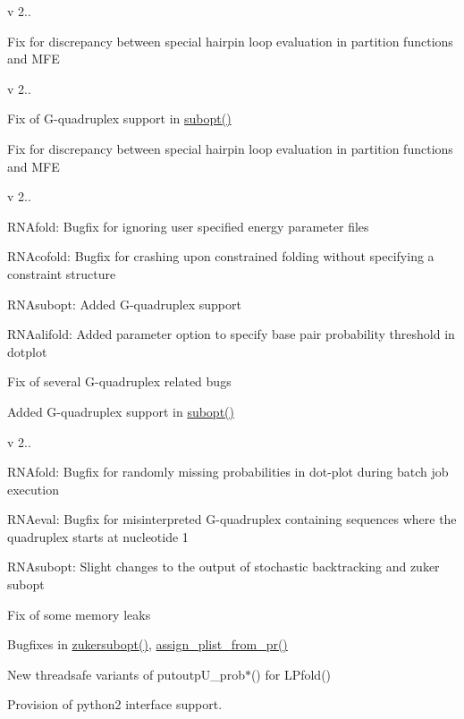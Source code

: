 v 2..
\begin{DoxyItemize}
\item Fix for discrepancy between special hairpin loop evaluation in partition functions and M\+FE
\end{DoxyItemize}

v 2..
\begin{DoxyItemize}
\item Fix of G-\/quadruplex support in \hyperlink{group__subopt__wuchty_ga700f662506a233e42dd7fda74fafd40e}{subopt()}
\item Fix for discrepancy between special hairpin loop evaluation in partition functions and M\+FE
\end{DoxyItemize}

v 2..
\begin{DoxyItemize}
\item R\+N\+Afold\+: Bugfix for ignoring user specified energy parameter files
\item R\+N\+Acofold\+: Bugfix for crashing upon constrained folding without specifying a constraint structure
\item R\+N\+Asubopt\+: Added G-\/quadruplex support
\item R\+N\+Aalifold\+: Added parameter option to specify base pair probability threshold in dotplot
\item Fix of several G-\/quadruplex related bugs
\item Added G-\/quadruplex support in \hyperlink{group__subopt__wuchty_ga700f662506a233e42dd7fda74fafd40e}{subopt()}
\end{DoxyItemize}

v 2..
\begin{DoxyItemize}
\item R\+N\+Afold\+: Bugfix for randomly missing probabilities in dot-\/plot during batch job execution
\item R\+N\+Aeval\+: Bugfix for misinterpreted G-\/quadruplex containing sequences where the quadruplex starts at nucleotide 1
\item R\+N\+Asubopt\+: Slight changes to the output of stochastic backtracking and zuker subopt
\item Fix of some memory leaks
\item Bugfixes in \hyperlink{group__subopt__zuker_ga0d5104e3ecf119d8eabd40aa5fe47f90}{zukersubopt()}, \hyperlink{group__pf__fold_ga1cc05aaa9b0e7df2d3887e98321c2030}{assign\+\_\+plist\+\_\+from\+\_\+pr()}
\item New threadsafe variants of putoutp\+U\+\_\+prob$\ast$() for L\+Pfold()
\item Provision of python2 interface support.
\end{DoxyItemize}

